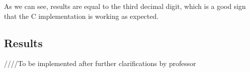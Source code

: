 \documentclass{article}
\begin{document}
As we can see, results are equal to the third decimal digit, which is a good sign that the C implementation is working as expected.

\subsection{Results}

////To be implemented after further clarifications by professor
\end{document}
